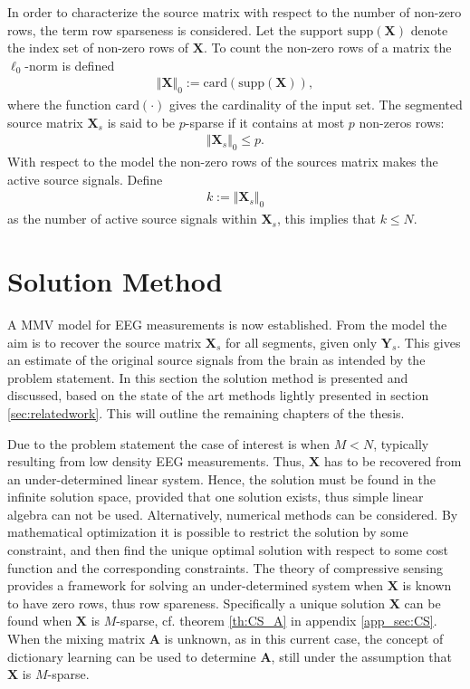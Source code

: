 In order to characterize the source matrix with respect to the number of non-zero rows, the term row sparseness is considered. 
Let the support $\text{supp}(\mathbf{X})$ denote the index set of non-zero rows of $\mathbf{X}$.
To count the non-zero rows of a matrix the $\ell_0$-norm is defined 
\begin{align*}
\Vert \mathbf{X} \Vert_0 := \text{card}(\text{supp}(\mathbf{X})),
\end{align*}
where the function $\text{card}(\cdot)$ gives the cardinality of the input set. The segmented source matrix $\textbf{X}_s$ is said to be $p$-sparse if it contains at most $p$ non-zeros rows:
\begin{align*}
\Vert \mathbf{X}_s \Vert_0 \leq p.
\end{align*}
With respect to the model the non-zero rows of the sources matrix makes the active source signals. Define  
\begin{align*}
k := \Vert \mathbf{X}_s \Vert_0
\end{align*} 
as the number of active source signals within $\textbf{X}_s$, this implies that $k\leq N$. 

\section{Solution Method}\label{sec:sol_met}
A MMV model for EEG measurements is now established.
From the model the aim is to recover the source matrix $\mathbf{X}_s$ for all segments, given only $\textbf{Y}_s$.
This gives an estimate of the original source signals from the brain as intended by the problem statement. 
In this section the solution method is presented and discussed, based on the state of the art methods lightly presented in section \ref{sec:relatedwork}. This will outline the remaining chapters of the thesis. 

Due to the problem statement the case of interest is when $M < N$, typically resulting from low density EEG measurements.  
Thus, $\mathbf{X}$ has to be recovered from an under-determined linear system. 
Hence, the solution must be found in the infinite solution space, provided that one solution exists, thus simple linear algebra can not be used. 
Alternatively, numerical methods can be considered. By mathematical optimization it is possible to restrict the solution by some constraint, and then find the unique optimal solution with respect to some cost function and the corresponding constraints.
The theory of compressive sensing provides a framework for solving an under-determined system when $\mathbf{X}$ is known to have zero rows, thus row spareness. 
Specifically a unique solution $\mathbf{X}$ can be found when $\mathbf{X}$ is $M$-sparse, cf. theorem \ref{th:CS_A} in appendix \ref{app_sec:CS}. 
When the mixing matrix $\mathbf{A}$ is unknown, as in this current case, the concept of dictionary learning can be used to determine $\mathbf{A}$, still under the assumption that $\mathbf{X}$ is $M$-sparse.  


